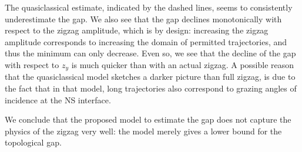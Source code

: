 			The quasiclassical estimate, indicated by the dashed lines, seems to consistently underestimate the gap.
			We also see that the gap declines monotonically with respect to the zigzag amplitude, which is by design: increasing the zigzag amplitude corresponds to increasing the domain of permitted trajectories, and thus the minimum can only decrease.
			Even so, we see that the decline of the gap with respect to $z_y$ is much quicker than with an actual zigzag.
			A possible reason that the quasiclassical model sketches a darker picture than full zigzag, is due to the fact that in that model, long trajectories also correspond to grazing angles of incidence at the NS interface.

			We conclude that the proposed model to estimate the gap does not capture the physics of the zigzag very well: the model merely gives a lower bound for the topological gap.
